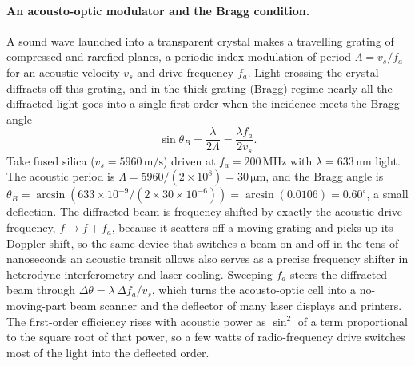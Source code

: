 \paragraph{An acousto-optic modulator and the Bragg condition.} A sound wave
launched into a transparent crystal makes a travelling grating of compressed and
rarefied planes, a periodic index modulation of period $\Lambda = v_s/f_a$ for an
acoustic velocity $v_s$ and drive frequency $f_a$. Light crossing the crystal
diffracts off this grating, and in the thick-grating (Bragg) regime nearly all the
diffracted light goes into a single first order when the incidence meets the Bragg
angle
\[
\sin\theta_B = \frac{\lambda}{2\Lambda} = \frac{\lambda f_a}{2 v_s}.
\]
Take fused silica ($v_s = 5960\,\si{\meter\per\second}$) driven at
$f_a = 200\,\si{\mega\hertz}$ with $\lambda = 633\,\si{\nano\meter}$ light. The
acoustic period is $\Lambda = 5960/(2\times 10^{8}) = 30\,\si{\micro\meter}$, and
the Bragg angle is $\theta_B = \arcsin(633\times 10^{-9}/(2\times 30\times
10^{-6})) = \arcsin(0.0106) = 0.60^{\circ}$, a small deflection. The diffracted
beam is frequency-shifted by exactly the acoustic drive frequency,
$f \to f + f_a$, because it scatters off a moving grating and picks up its Doppler
shift, so the same device that switches a beam on and off in the tens of
nanoseconds an acoustic transit allows also serves as a precise frequency shifter
in heterodyne interferometry and laser cooling. Sweeping $f_a$ steers the
diffracted beam through $\Delta\theta = \lambda\,\Delta f_a/v_s$, which turns the
acousto-optic cell into a no-moving-part beam scanner and the deflector of many
laser displays and printers. The first-order efficiency rises with acoustic power
as $\sin^2$ of a term proportional to the square root of that power, so a few watts
of radio-frequency drive switches most of the light into the deflected order.

